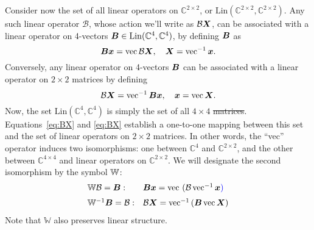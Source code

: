 \documentclass[useAMS,usenatbib]{mn2e}
\newcommand{\COMPLEX}{\mathbb{C}}
\newcommand{\mat}[1]{{\bmath{#1}}}
\numberwithin{equation}{section}
\providecommand{\DIFadd}[1]{{\protect\color{blue}\uwave{#1}}} %
\providecommand{\DIFdel}[1]{{\protect\color{red}\sout{#1}}}                      %
\providecommand{\DIFaddbegin}{} %
\providecommand{\DIFaddend}{} %
\providecommand{\DIFdelbegin}{} %
\providecommand{\DIFdelend}{} %
\begin{document}
Consider now the set of all linear operators on $\COMPLEX^{2\times2}$, or $\mathrm{Lin}(\COMPLEX^{2\times2},\COMPLEX^{2\times2}).$
Any such linear operator $\mathcal{B}$, whose action we'll write as $\mathcal{B}\mat{X}$, can be associated with a linear operator 
on 4-vectors $\mat{B}\in\mathrm{Lin}(\COMPLEX^4,\COMPLEX^4)$, by defining $\mat{B}$ as
\begin{equation}
\label{eq:Bx}
\mat{B}\bmath{x} = \VEC{\mathcal{B}\mat{X}},~~~\mat{X}=\VECINV{\bmath{x}}.
\end{equation}
Conversely, any linear operator on 4-vectors $\mat{B}$ can be associated with a linear operator on $2\times2$ matrices by defining
\begin{equation}
\label{eq:BX}
\mathcal{B}\mat{X} = \VECINV{\mat{B}\bmath{x}},~~~\bmath{x}=\VEC{\mat{X}}.
\end{equation}
Now, the set $\mathrm{Lin}(\COMPLEX^4,\COMPLEX^4)$ is simply the set of all $4\times4$ \DIFdelbegin \DIFdel{matrices}\DIFdelend \DIFaddbegin \DIFadd{matrix multipliers}\DIFaddend . Equations~\ref{eq:BX} 
and \ref{eq:BX} establish a one-to-one mapping between this set and the set of linear operators on $2\times2$ 
matrices. In other words, the ``vec'' operator induces two isomorphisms: one between $\COMPLEX^4$ and $\COMPLEX^{2\times2}$,
and the other between $\COMPLEX^{4\times4}$ and linear operators on $\COMPLEX^{2\times2}$. We will designate the second isomorphism 
by the symbol $\mathbb{W}$:
\begin{equation}
\begin{array}{ll}
\WW\mathcal{B} = \mat{B}: & \mat{B}\bmath{x} = \DIFdelbegin %
\DIFdelend \DIFaddbegin \VEC{\,(\mathcal{B}\,\VECINV{\bmath{x}}}\DIFadd{) }\DIFaddend \\
\WWi\mat{B} = \mathcal{B}: & \mathcal{B}\mat{X} = \VECINV{(\mat{B}\,\VEC{\mat{X}})} 
\end{array}
\end{equation}
Note that $\mathbb{W}$ also preserves linear structure.
\end{document}
